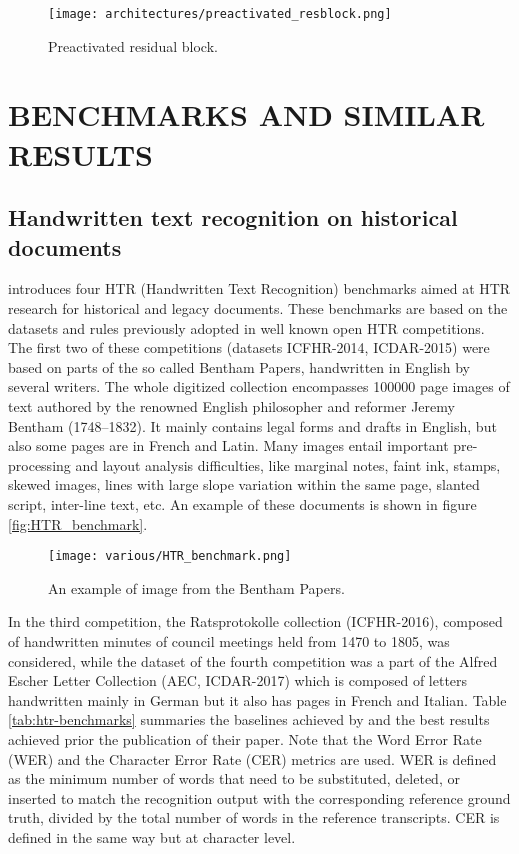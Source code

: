 \begin{figure}[h]
	\caption{Preactivated residual block.}
	\centering
	\texttt{[image: architectures/preactivated\_resblock.png]}
	\label{fig:preactresblock}
\end{figure}

\section{\uppercase{Benchmarks and similar results}}
\label{sec:stateofart}

\subsection{Handwritten text recognition on historical documents}
\label{ssec:historicaldocuments}

\cite{Sanchez2019-pi} introduces four HTR (Handwritten Text Recognition) benchmarks aimed at HTR research for historical and legacy documents. These benchmarks are based on the datasets and rules previously adopted in well known open HTR competitions. The first two of these competitions (datasets ICFHR-2014, ICDAR-2015) were based on parts of the so called Bentham Papers, handwritten in English by several writers. The whole digitized collection encompasses 100000 page images of text authored by the renowned English philosopher and reformer Jeremy Bentham (1748–1832). It mainly contains legal forms and drafts in English, but also some pages are in French and Latin. Many images entail important pre-processing and layout analysis difficulties, like marginal notes, faint ink, stamps, skewed images, lines with large slope variation within the same page, slanted script, inter-line text, etc. An example of these documents is shown in figure \ref{fig:HTR_benchmark}.

\begin{figure}[h]
	\caption{An example of image from the Bentham Papers.}
	\centering
	\texttt{[image: various/HTR\_benchmark.png]}
	\label{fig:HTRbenchmark}
\end{figure}

In the third competition, the Ratsprotokolle collection (ICFHR-2016), composed of handwritten minutes of council meetings held from 1470 to 1805, was considered, while the dataset of the fourth competition was a part of the Alfred Escher Letter Collection (AEC, ICDAR-2017) which is composed of letters handwritten mainly in German but it also has pages in French and Italian. Table \ref{tab:htr-benchmarks} summaries the baselines achieved by \cite{Sanchez2019-pi} and the best results achieved prior the publication of their paper. Note that the Word Error Rate (WER) and the Character Error Rate (CER) metrics are used. WER is defined as the minimum number of words that need to be substituted, deleted, or inserted to match the recognition output with the corresponding reference ground truth, divided by the total number of words in the reference transcripts. CER is defined in the same way but at character level.

